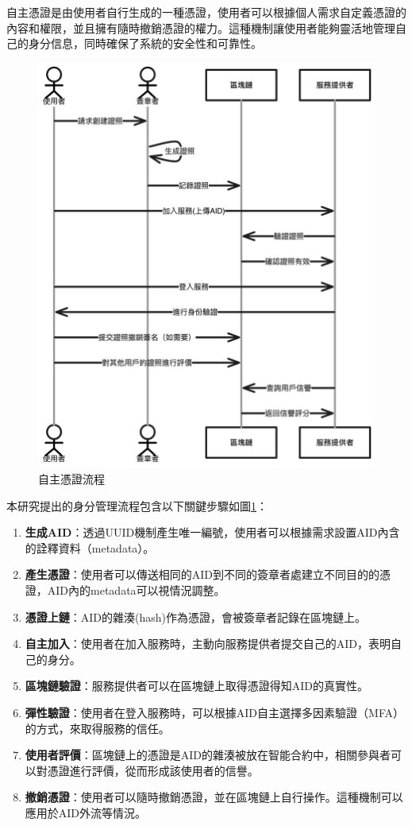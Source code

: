 自主憑證是由使用者自行生成的一種憑證，使用者可以根據個人需求自定義憑證的內容和權限，並且擁有隨時撤銷憑證的權力。這種機制讓使用者能夠靈活地管理自己的身分信息，同時確保了系統的安全性和可靠性。
\begin{figure}
  \centering
  \includegraphics[width=\linewidth,keepaspectratio]{figures/flow-sc.png}
  \caption{自主憑證流程}
  \label{fig:flow-sc}
\end{figure}
本研究提出的身分管理流程包含以下關鍵步驟如圖\ref{fig:flow-sc}：
\begin{enumerate}
  \item \textbf{生成AID}：透過UUID\cite{uuid}機制產生唯一編號，使用者可以根據需求設置AID內含的詮釋資料（metadata）。
  \item \textbf{產生憑證}：使用者可以傳送相同的AID到不同的簽章者處建立不同目的的憑證，AID內的metadata可以視情況調整。
  \item \textbf{憑證上鏈}：AID的雜湊(hash)作為憑證，會被簽章者記錄在區塊鏈上。
  \item \textbf{自主加入}：使用者在加入服務時，主動向服務提供者提交自己的AID，表明自己的身分。
  \item \textbf{區塊鏈驗證}：服務提供者可以在區塊鏈上取得憑證得知AID的真實性。
  \item \textbf{彈性驗證}：使用者在登入服務時，可以根據AID自主選擇多因素驗證（MFA）的方式，來取得服務的信任。
  \item \textbf{使用者評價}：區塊鏈上的憑證是AID的雜湊被放在智能合約中，相關參與者可以對憑證進行評價，從而形成該使用者的信譽。
  \item \textbf{撤銷憑證}：使用者可以隨時撤銷憑證，並在區塊鏈上自行操作。這種機制可以應用於AID外流等情況。
\end{enumerate}
